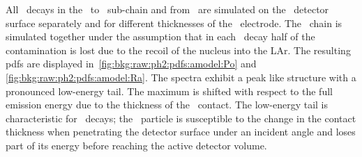 All \a\ decays in the \Ra\ to \Pbl\ sub-chain and from \Po\ are
simulated on the \pplus\ detector surface separately and for different
thicknesses of the \pplus\ electrode. The \Ra\ chain is simulated
together under the assumption that in each \a\ decay half of the
contamination is lost due to the recoil of the nucleus into the LAr. The
resulting pdfs are displayed in~\cref{fig:bkg:raw:ph2:pdfs:amodel:Po}
and \cref{fig:bkg:raw:ph2:pdfs:amodel:Ra}. The spectra exhibit a peak
like structure with a pronounced low-energy tail.  The maximum is
shifted with respect to the full emission energy due to the thickness of
the \pplus\ contact.  The low-energy tail is characteristic for \a\
decays; the \a\ particle is susceptible to the change in the contact
thickness when penetrating the detector surface under an incident angle
and loses part of its energy before reaching the active detector volume.

